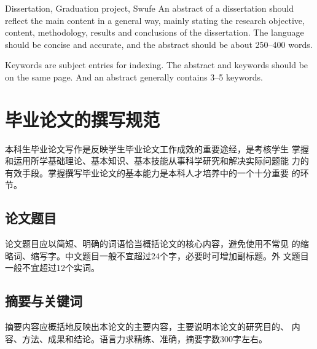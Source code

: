 \documentclass{swufethesis}
\begin{document}
\maketitle %
\statement %

\frontmatter %
\begin{abstract}{毕业论文, 毕业设计, 西南财经大学}
  摘要内容应概括地反映出本论文的主要内容，主要说明本论文的研究目的、
  内容、方法、成果和结论。语言力求精练、准确，摘要字数300字左右。

  关键词是供检索用的主题词条。摘要与关键词应在同一页。关键词一般3--5个。
\end{abstract}

\begin{abstract*}{Dissertation, Graduation project, Swufe}
  An abstract of a dissertation should reflect the main content in a general way,
  mainly stating the research objective, content, methodology, results and conclusions
  of the dissertation. The language should be concise and accurate, and the abstract
  should be about 250--400 words.

  Keywords are subject entries for indexing. The abstract and keywords should be
  on the same page. And an abstract generally contains 3--5 keywords.
\end{abstract*}

\tableofcontents

\mainmatter %
\chapter{毕业论文的撰写规范}
本科生毕业论文写作是反映学生毕业论文工作成效的重要途经，是考核学生
掌握和运用所学基础理论、基本知识、基本技能从事科学研究和解决实际问题能
力的有效手段。掌握撰写毕业论文的基本能力是本科人才培养中的一个十分重要
的环节。
\section{论文题目}
论文题目应以简短、明确的词语恰当概括论文的核心内容，避免使用不常见
的缩略词、缩写字。中文题目一般不宜超过24个字，必要时可增加副标题。外
文题目一般不宜超过12个实词。

\section{摘要与关键词}
摘要内容应概括地反映出本论文的主要内容，主要说明本论文的研究目的、
内容、方法、成果和结论。语言力求精练、准确，摘要字数300字左右。
\end{document}
